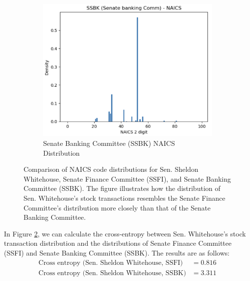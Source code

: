\documentclass[15pt,letterpaper]{article}
\begin{document}
\begin{figure}[ht]
\begin{subfigure}[b]{0.3\textwidth}
  \end{subfigure}
  \hfill
  \begin{subfigure}[b]{0.3\textwidth}
      \includegraphics[width=\textwidth, height=0.2\textheight]{imgs/ssbk-entire2.png}
      \caption{Senate Banking Committee (SSBK) NAICS Distribution}
      \label{fig:ssbk_density}
  \end{subfigure}
  \caption{Comparison of NAICS code distributions for Sen. Sheldon Whitehouse, Senate Finance Committee (SSFI), and Senate Banking Committee (SSBK). The figure illustrates how the distribution of Sen. Whitehouse's stock transactions resembles the Senate Finance Committee's distribution more closely than that of the Senate Banking Committee.}
  \label{fig:density_plots}
\end{figure}

In Figure \ref{fig:density_plots}, we can calculate the cross-entropy between Sen. Whitehouse's stock transaction distribution and the distributions of Senate Finance Committee (SSFI) and Senate Banking Committee (SSBK). The results are as follows:
\begin{align*}
  \text{Cross entropy (Sen. Sheldon Whitehouse, SSFI)} &= 0.816 \\
  \text{Cross entropy (Sen. Sheldon Whitehouse, SSBK)} &= 3.311
\end{align*}
\end{document}
